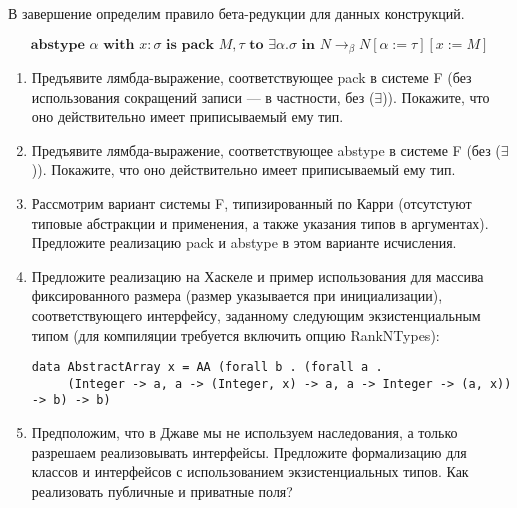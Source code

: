 \documentclass[10pt,a4paper,oneside]{article}
\begin{document}
\begin{enumerate}
В завершение определим правило бета-редукции для данных конструкций.

$$\textbf{abstype }\alpha\textbf{ with }x:\sigma\textbf{ is pack }M,\tau\textbf{ to }\exists\alpha.\sigma\textbf{ in }N
   \rightarrow_\beta N[\alpha:=\tau][x := M]$$

\begin{enumerate}
\item Предъявите лямбда-выражение, соответствующее pack в системе F (без использования сокращений записи ---
в частности, без ($\exists$)). Покажите, что оно действительно имеет приписываемый ему тип.
\item Предъявите лямбда-выражение, соответствующее abstype в системе F (без ($\exists$)). Покажите, что оно действительно имеет приписываемый ему тип.
\item Рассмотрим вариант системы F, типизированный по Карри (отсутстуют типовые абстракции и применения, а также указания
типов в аргументах). Предложите реализацию pack и abstype в этом варианте исчисления.
\item Предложите реализацию на Хаскеле и пример использования для массива фиксированного размера (размер указывается при инициализации), 
соответствующего интерфейсу, заданному следующим экзистенциальным типом (для компиляции требуется включить опцию RankNTypes):

\begin{verbatim}
data AbstractArray x = AA (forall b . (forall a . 
     (Integer -> a, a -> (Integer, x) -> a, a -> Integer -> (a, x)) -> b) -> b)
\end{verbatim}

\item Предположим, что в Джаве мы не используем наследования, а только разрешаем реализовывать интерфейсы. 
Предложите формализацию для классов и интерфейсов с использованием экзистенциальных типов.
Как реализовать публичные и приватные поля?
\end{enumerate}
\end{enumerate}
\end{document}
